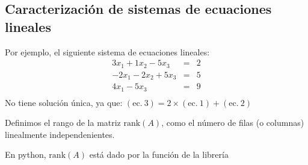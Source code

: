 \documentclass[letterpaper,10pt,english]{jupyterBook}
\begin{document}
\subsection{Caracterización de sistemas de ecuaciones lineales}
\label{\detokenize{1.2-Algebra_lineal/1.2-Algebra_lineal:caracterizacion-de-sistemas-de-ecuaciones-lineales}}
\sphinxAtStartPar
{}

\sphinxAtStartPar
Por ejemplo, el siguiente sistema de ecuaciones lineales:
\begin{eqnarray*}
3x_1 + 1x_2 - 5x_3 &=& 2 \\
-2x_1 - 2x_2 + 5x_3 &=& 5 \\
4x_1 -5x_3  &=& 9 \\
\end{eqnarray*}
\sphinxAtStartPar
No tiene solución única, ya que: \((\mathrm{ec.~}3) = 2\times(\mathrm{ec.~}1) + (\mathrm{ec.~}2)\)

\sphinxAtStartPar
Definimos el rango de la matriz \(\mathrm{rank}(A)\), como el número de filas (o columnas) linealmente independenientes.

\sphinxAtStartPar
En python, \(\mathrm{rank}(A)\) está dado por la función  de la librería 
\end{document}
